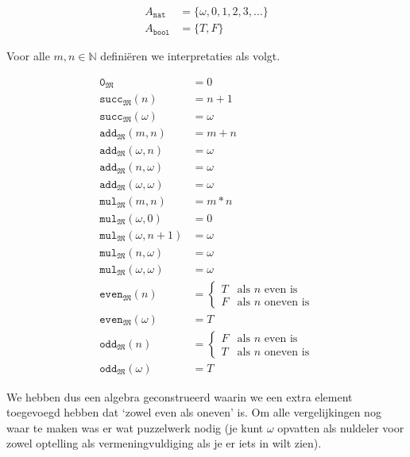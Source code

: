 \documentclass[a4paper,11pt]{article}
\begin{document}
\begin{align*}
A_{\texttt{nat}} &= \{ \omega, 0, 1, 2, 3, \ldots \} \\
A_{\texttt{bool}} &= \{T, F\}
\end{align*}

Voor alle $m,n \in \mathbb{N}$ defini\"eren we interpretaties als volgt.

\begin{align*}
\texttt{0}_{\mathfrak{M}}                  &= 0 \\
\texttt{succ}_{\mathfrak{M}}(n)            &= n+1 \\
\texttt{succ}_{\mathfrak{M}}(\omega)       &= \omega \\
\texttt{add}_{\mathfrak{M}}(m,n)           &= m+n \\
\texttt{add}_{\mathfrak{M}}(\omega,n)      &= \omega \\
\texttt{add}_{\mathfrak{M}}(n,\omega)      &= \omega \\
\texttt{add}_{\mathfrak{M}}(\omega,\omega) &= \omega \\
\texttt{mul}_{\mathfrak{M}}(m,n)           &= m*n \\
\texttt{mul}_{\mathfrak{M}}(\omega,0)      &= 0 \\
\texttt{mul}_{\mathfrak{M}}(\omega,n+1)    &= \omega \\
\texttt{mul}_{\mathfrak{M}}(n,\omega)      &= \omega \\
\texttt{mul}_{\mathfrak{M}}(\omega,\omega) &= \omega \\
\texttt{even}_{\mathfrak{M}}(n)            &= \begin{cases}
  T & \text{als $n$ even is} \\
  F & \text{als $n$ oneven is}
\end{cases} \\
\texttt{even}_{\mathfrak{M}}(\omega)       &= T \\
\texttt{odd}_{\mathfrak{M}}(n)             &= \begin{cases}
  F & \text{als $n$ even is} \\
  T & \text{als $n$ oneven is}
\end{cases} \\
\texttt{odd}_{\mathfrak{M}}(\omega)        &= T
\end{align*}

We hebben dus een algebra geconstrueerd waarin we een extra element toegevoegd
hebben dat `zowel even als oneven' is. Om alle vergelijkingen nog waar te
maken was er wat puzzelwerk nodig (je kunt $\omega$ opvatten als nuldeler voor
zowel optelling als vermeningvuldiging als je er iets in wilt zien).
\end{document}
